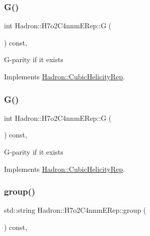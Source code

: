 \subsubsection{\texorpdfstring{G()}{G()}\hspace{0.1cm}{\footnotesize\ttfamily [2/3]}}
{\footnotesize\ttfamily int Hadron\+::\+H7o2\+C4nnm\+E\+Rep\+::G (\begin{DoxyParamCaption}{ }\end{DoxyParamCaption}) const\hspace{0.3cm}{\ttfamily [inline]}, {\ttfamily [virtual]}}

G-\/parity if it exists 

Implements \mbox{\hyperlink{structHadron_1_1CubicHelicityRep_a50689f42be1e6170aa8cf6ad0597018b}{Hadron\+::\+Cubic\+Helicity\+Rep}}.

\mbox{\label{structHadron_1_1H7o2C4nnmERep_a55e0c3bf732ef6bd2ae6b0948fa7e21c}} 
\subsubsection{\texorpdfstring{G()}{G()}\hspace{0.1cm}{\footnotesize\ttfamily [3/3]}}
{\footnotesize\ttfamily int Hadron\+::\+H7o2\+C4nnm\+E\+Rep\+::G (\begin{DoxyParamCaption}{ }\end{DoxyParamCaption}) const\hspace{0.3cm}{\ttfamily [inline]}, {\ttfamily [virtual]}}

G-\/parity if it exists 

Implements \mbox{\hyperlink{structHadron_1_1CubicHelicityRep_a50689f42be1e6170aa8cf6ad0597018b}{Hadron\+::\+Cubic\+Helicity\+Rep}}.

\mbox{\label{structHadron_1_1H7o2C4nnmERep_ac3302d0096df1ab32253be3f3e289b83}} 
\subsubsection{\texorpdfstring{group()}{group()}\hspace{0.1cm}{\footnotesize\ttfamily [1/3]}}
{\footnotesize\ttfamily std\+::string Hadron\+::\+H7o2\+C4nnm\+E\+Rep\+::group (\begin{DoxyParamCaption}{ }\end{DoxyParamCaption}) const\hspace{0.3cm}{\ttfamily [inline]}, {\ttfamily [virtual]}}

